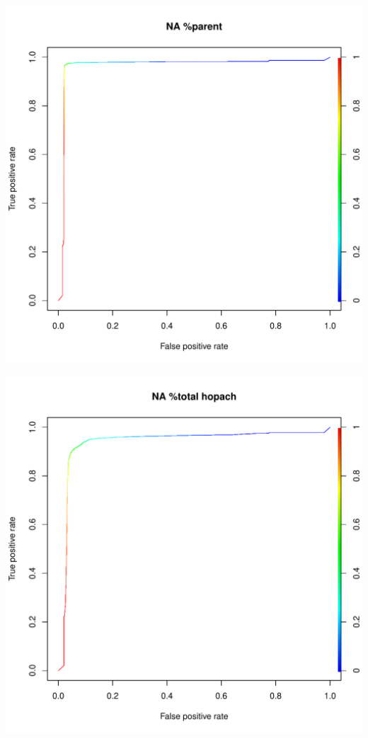 \documentclass[11pt,a4paper,twoside]{report}\usepackage[]{graphicx}\usepackage[]{color}
\makeatletter
\def\maxwidth{ %
  \ifdim\Gin@nat@width>\linewidth
    \linewidth
  \else
    \Gin@nat@width
  \fi
}
\newenvironment{knitrout}{}{} %
\makeatother
\begin{document}
\begin{knitrout}
\includegraphics[width=\maxwidth]{figure/fig_code-21} 

\includegraphics[width=\maxwidth]{figure/fig_code-22} 


\end{knitrout}
\end{document}
